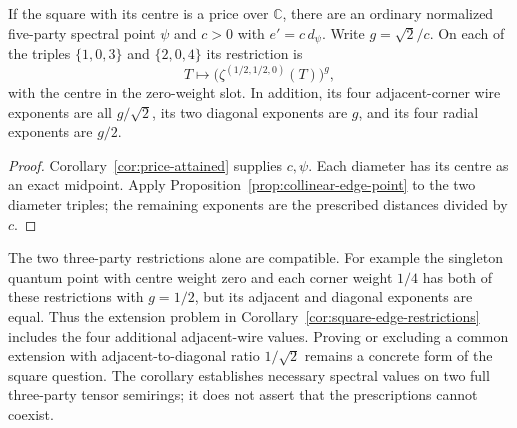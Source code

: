 \begin{corollary}
\label{cor:square-edge-restrictions}
If the square with its centre is a price over $\mathbb C$, there are an ordinary normalized five-party spectral point $\psi$ and $c>0$ with $e'=c\,d_\psi$.  Write $g=\sqrt2/c$.  On each of the triples $\{1,0,3\}$ and $\{2,0,4\}$ its restriction is
\[
 T\longmapsto\bigl(\zeta^{(1/2,1/2,0)}(T)\bigr)^g,
\]
with the centre in the zero-weight slot.  In addition, its four adjacent-corner wire exponents are all $g/\sqrt2$, its two diagonal exponents are $g$, and its four radial exponents are $g/2$.
\end{corollary}
\begin{proof}
Corollary~\ref{cor:price-attained} supplies $c,\psi$.  Each diameter has its centre as an exact midpoint.  Apply Proposition~\ref{prop:collinear-edge-point} to the two diameter triples; the remaining exponents are the prescribed distances divided by $c$.
\end{proof}

The two three-party restrictions alone are compatible.  For example the singleton quantum point with centre weight zero and each corner weight $1/4$ has both of these restrictions with $g=1/2$, but its adjacent and diagonal exponents are equal.  Thus the extension problem in Corollary~\ref{cor:square-edge-restrictions} includes the four additional adjacent-wire values.  Proving or excluding a common extension with adjacent-to-diagonal ratio $1/\sqrt2$ remains a concrete form of the square question.  The corollary establishes necessary spectral values on two full three-party tensor semirings; it does not assert that the prescriptions cannot coexist.

